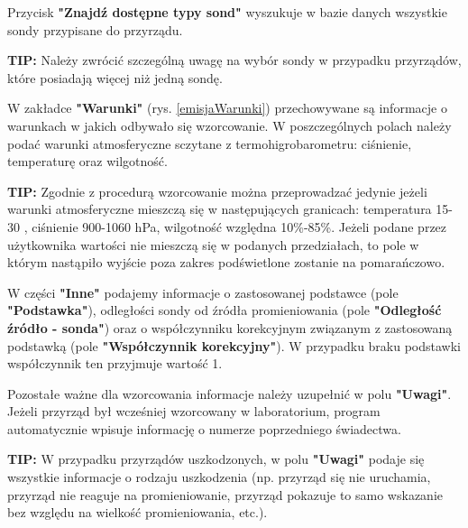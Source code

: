 	Przycisk \textbf{"Znajdź dostępne typy sond"} wyszukuje w bazie danych wszystkie sondy przypisane do przyrządu.
	
	\textbf{TIP:} Należy zwrócić szczególną uwagę na wybór sondy w przypadku przyrządów, które posiadają więcej niż jedną sondę.
	
	W zakładce \textbf{"Warunki"} (rys. \ref{emisjaWarunki}) przechowywane są informacje o warunkach w jakich odbywało się wzorcowanie. W poszczególnych polach należy podać warunki atmosferyczne sczytane z termohigrobarometru: ciśnienie, temperaturę oraz wilgotność.
	
	\textbf{TIP:} Zgodnie z procedurą wzorcowanie można przeprowadzać jedynie jeżeli warunki atmosferyczne mieszczą się w następujących granicach: temperatura 15-30 \textcelsius, ciśnienie 900-1060 hPa,  wilgotność względna 10\%-85\%. Jeżeli podane przez użytkownika wartości nie mieszczą się w podanych przedziałach, to pole w którym nastąpiło wyjście poza zakres podświetlone zostanie na pomarańczowo.
	
	W części \textbf{"Inne"} podajemy informacje o zastosowanej podstawce (pole \textbf{"Podstawka"}), odległości sondy od źródła promieniowania (pole \textbf{"Odległość źródło - sonda"}) oraz o współczynniku korekcyjnym związanym z zastosowaną podstawką (pole \textbf{"Współczynnik korekcyjny"}). W przypadku braku podstawki współczynnik ten przyjmuje wartość 1.
	
	Pozostałe ważne dla wzorcowania informacje należy uzupełnić w polu \textbf{"Uwagi"}. Jeżeli przyrząd był wcześniej wzorcowany w laboratorium, program automatycznie wpisuje informację o numerze poprzedniego świadectwa.  
	
	\textbf{TIP:} W przypadku przyrządów uszkodzonych, w polu \textbf{"Uwagi"} podaje się wszystkie informacje o rodzaju uszkodzenia (np. przyrząd się nie uruchamia, przyrząd nie reaguje na promieniowanie, przyrząd pokazuje to samo wskazanie bez względu na wielkość promieniowania, etc.).
	
